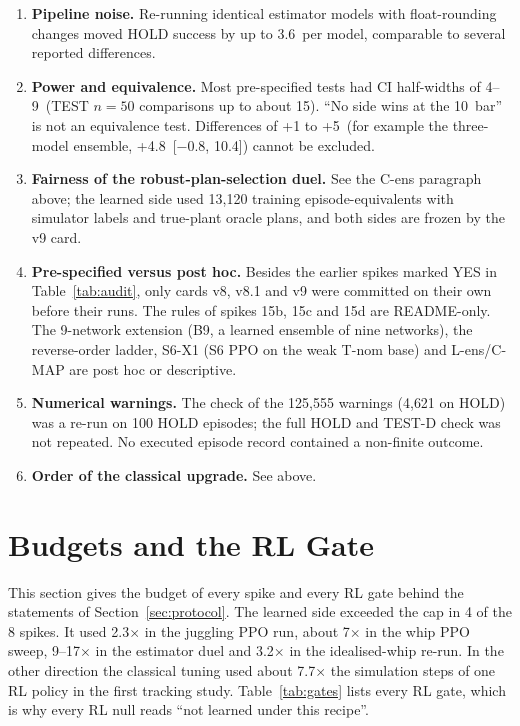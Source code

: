 \begin{enumerate}
\item \textbf{Pipeline noise.} Re-running identical estimator models with float-rounding changes moved HOLD success by up to 3.6\pp\ per model, comparable to several reported differences.
\item \textbf{Power and equivalence.} Most pre-specified tests had CI half-widths of 4--9\pp\ (TEST $n{=}50$ comparisons up to about 15\pp). ``No side wins at the 10\pp\ bar'' is not an equivalence test. Differences of +1 to +5\pp\ (for example the three-model ensemble, +4.8\pp\ [$-0.8$, 10.4]) cannot be excluded.
\item \textbf{Fairness of the robust-plan-selection duel.} See the C-ens paragraph above; the learned side used 13{,}120 training episode-equivalents with simulator labels and true-plant oracle plans, and both sides are frozen by the v9 card.
\item \textbf{Pre-specified versus post hoc.} Besides the earlier spikes marked YES in Table~\ref{tab:audit}, only cards v8, v8.1 and v9 were committed on their own before their runs. The rules of spikes 15b, 15c and 15d are README-only. The 9-network extension (B9, a learned ensemble of nine networks), the reverse-order ladder, S6-X1 (S6 PPO on the weak T-nom base) and L-ens/C-MAP are post hoc or descriptive.
\item \textbf{Numerical warnings.} The check of the 125{,}555 warnings (4{,}621 on HOLD) was a re-run on 100 HOLD episodes; the full HOLD and TEST-D check was not repeated. No executed episode record contained a non-finite outcome.
\item \textbf{Order of the classical upgrade.} See above.
\end{enumerate}

\section{Budgets and the RL Gate}
\label{app:budget}

This section gives the budget of every spike and every RL gate behind the statements of Section~\ref{sec:protocol}. The learned side exceeded the cap in 4 of the 8 spikes. It used 2.3$\times$ in the juggling PPO run, about 7$\times$ in the whip PPO sweep, 9--17$\times$ in the estimator duel and 3.2$\times$ in the idealised-whip re-run. In the other direction the classical tuning used about 7.7$\times$ the simulation steps of one RL policy in the first tracking study. Table~\ref{tab:gates} lists every RL gate, which is why every RL null reads ``not learned under this recipe''.

